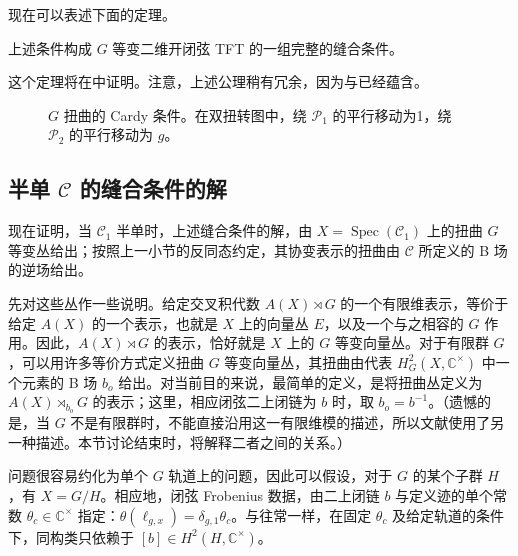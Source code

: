 现在可以表述下面的定理。

\begin{theorem}\label{thm:2.15}
上述条件构成 $G$ 等变二维开闭弦 TFT 的一组完整的缝合条件。
\end{theorem}

这个定理将在中证明。注意，上述公理稍有冗余，因为与已经蕴含。

\begin{figure}[H]
\centering
{}
\caption{$G$ 扭曲的 Cardy 条件。在双扭转图中，绕 $\mathcal{P}_1$ 的平行移动为1，绕 $\mathcal{P}_2$ 的平行移动为 $g$。}\label{fig:2.30}
\end{figure}

\subsection{半单 \texorpdfstring{$\mathcal{C}$}{C} 的缝合条件的解}\label{sec:2.6.5}

现在证明，当 $\mathcal{C}_1$ 半单时，上述缝合条件的解，由 $X=\operatorname{Spec}(\mathcal{C}_1)$ 上的扭曲 $G$ 等变丛给出；按照上一小节的反同态约定，其协变表示的扭曲由 $\mathcal{C}$ 所定义的 B 场的逆场给出。

先对这些丛作一些说明。给定交叉积代数 $A(X)\rtimes G$ 的一个有限维表示，等价于给定 $A(X)$ 的一个表示，也就是 $X$ 上的向量丛 $E$，以及一个与之相容的 $G$ 作用。因此，$A(X)\rtimes G$ 的表示，恰好就是 $X$ 上的 $G$ 等变向量丛。对于有限群 $G$，可以用许多等价方式定义扭曲 $G$ 等变向量丛，其扭曲由代表 $H_G^2(X,\mathbb{C}^{\times})$ 中一个元素的 B 场 $b_o$ 给出。对当前目的来说，最简单的定义，是将扭曲丛定义为 $A(X)\rtimes_{b_o}G$ 的表示；这里，相应闭弦二上闭链为 $b$ 时，取 $b_o=b^{-1}$。（遗憾的是，当 $G$ 不是有限群时，不能直接沿用这一有限维模的描述，所以文献使用了另一种描述。本节讨论结束时，将解释二者之间的关系。）

问题很容易约化为单个 $G$ 轨道上的问题，因此可以假设，对于 $G$ 的某个子群 $H$，有 $X=G/H$。相应地，闭弦 Frobenius 数据，由二上闭链 $b$ 与定义迹的单个常数 $\theta_c\in\mathbb{C}^{\times}$ 指定：$\theta(\ell_{g,x})=\delta_{g,1}\theta_c$。与往常一样，在固定 $\theta_c$ 及给定轨道的条件下，同构类只依赖于 $[b]\in H^2(H,\mathbb{C}^{\times})$。

